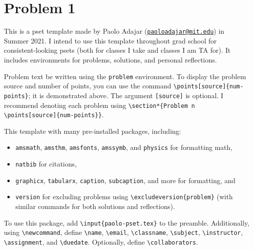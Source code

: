 \documentclass[11pt]{article}
\begin{document}
	
	
	\psetheader
	
	\section*{Problem 1 }
	\begin{problem}
		This is a pset template made by Paolo Adajar (\href{mailto:paoloadajar@mit.edu}{\tt paoloadajar@mit.edu}) in Summer 2021. I intend to use this template throughout grad school for consistent-looking psets (both for classes I take and classes I am TA for). It includes environments for problems, solutions, and personal reflections.
		
		Problem text be written using the \texttt{problem} environment. To display the problem source and number of points, you can use the command \texttt{\textbackslash points[source]\{num-points\}}; it is demonstrated above. The argument \texttt{[source]} is optional. I recommend denoting each problem using \texttt{\textbackslash section*\{Problem n \textbackslash points[source]\{num-points\}\}}.
		
		This template with many pre-installed packages, including:
		\begin{itemize}
			\item \texttt{amsmath}, \texttt{amsthm}, \texttt{amsfonts}, \texttt{amssymb}, and \texttt{physics} for formatting math,
			\item \texttt{natbib} for citations,
			\item \texttt{graphicx}, \texttt{tabularx}, \texttt{caption}, \texttt{subcaption}, and more for formatting, and
			\item \texttt{version} for excluding problems using \texttt{\textbackslash excludeversion\{problem\}} (with similar commands for both solutions and reflections).
		\end{itemize}
	
		To use this package, add \texttt{\textbackslash input\{paolo-pset.tex\}} to the preamble. Additionally, using \texttt{\textbackslash newcommand}, define \texttt{\textbackslash name}, \texttt{\textbackslash email}, \texttt{\textbackslash classname}, \texttt{\textbackslash subject}, \texttt{\textbackslash instructor}, \texttt{\textbackslash assignment}, and \texttt{\textbackslash duedate}. Optionally, define \texttt{\textbackslash collaborators}.
	\end{problem}
\end{document}
